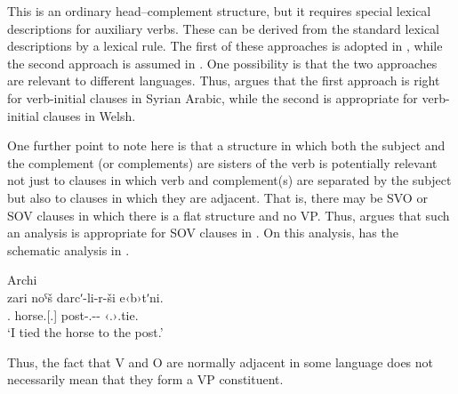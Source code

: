 \documentclass[output=paper]{langsci/langscibook}
\begin{document}
\ea\label{ex:key:4.23}
\z
%
This is an ordinary head--complement structure, but it requires special lexical
descriptions for auxiliary verbs. These can be derived from the standard
lexical descriptions by a lexical rule. The first of these approaches is
adopted in \citet[36]{GinSag2000}, while the second approach is assumed in
\citet[410]{SagWasBen2003}. One possibility is that the two approaches are
relevant to different languages. Thus, \citet{Borsley1995} argues that the
first approach is right for verb-initial clauses in Syrian Arabic, while the
second is appropriate for verb-initial clauses in Welsh.

One further point to note here is that a structure in which both the subject
and the complement (or complements) are sisters of the verb is potentially
relevant not just to clauses in which verb and complement(s) are separated by
the subject but also to clauses in which they are adjacent. That is, there may
be SVO or SOV clauses in which there is a flat structure and no VP. Thus,
\citet{Borsley2016} argues that such an analysis is appropriate for SOV clauses
in . On this analysis,  has the schematic analysis in
.

\ea\label{ex:key:4.24}Archi\\
    \sn
    \gll zari noˤš darcʹ-li-r-ši e‹b›tʹni.\\
            \Fsg.\Erg{} horse.\Iii{}[\Sg.\Abs{}] post-\Obl.\Sg{}-\Cont-\All{} ‹\Iii.\Sg›.tie.\Pfv{}\\
    \glt    \enquote*{I tied the horse to the post.}
\z

\ea\label{ex:key:4.25}
\z
%
Thus, the fact that V and O are normally adjacent in some language does not
necessarily mean that they form a VP constituent.
\end{document}
